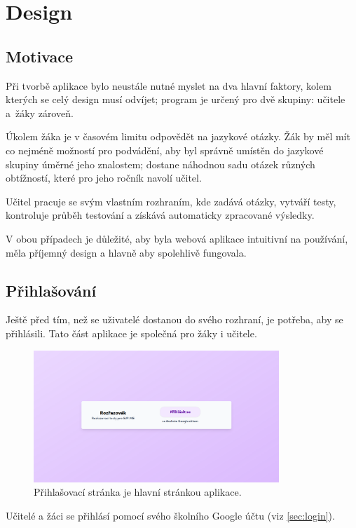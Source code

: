 \hypertarget{Design}{\chapter{Design}}

\section{Motivace}

Při tvorbě aplikace bylo neustále nutné myslet na dva hlavní faktory, kolem kterých se celý design musí odvíjet; program je určený pro dvě skupiny: učitele a~žáky zároveň. 

Úkolem žáka je v časovém limitu odpovědět na jazykové otázky. Žák by měl mít co nejméně možností pro podvádění, aby byl správně umístěn do jazykové skupiny úměrné jeho znalostem; dostane náhodnou sadu otázek různých obtížností, které pro jeho ročník navolí učitel.

Učitel pracuje se svým vlastním rozhraním, kde zadává otázky, vytváří testy, \mbox{kontroluje} průběh testování a získává automaticky zpracované výsledky.

V obou případech je důležité, aby byla webová aplikace intuitivní na používání, měla příjemný design a hlavně aby spolehlivě fungovala.

\section{Přihlašování}
\label{sec:login-design}

Ještě před tím, než se uživatelé dostanou do svého rozhraní, je potřeba, aby se přihlásili. Tato část aplikace je společná pro žáky i učitele. 

\begin{figure}[H]
    \centering
    \includegraphics[width=350px]{images/01design/login.png}
    \caption{Přihlašovací stránka je hlavní stránkou aplikace.}
\end{figure}

Učitelé a žáci se přihlásí pomocí svého školního Google účtu (viz \ref{sec:login}).

